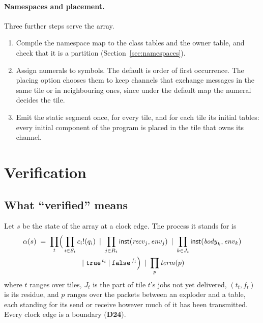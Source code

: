 \documentclass[10.5pt,a4paper]{extarticle}
\newcommand{\kw}[1]{\texttt{#1}}
\newcommand{\tru}{\kw{true}}
\newcommand{\fls}{\kw{false}}
\newcommand{\snd}[2]{#1!(#2)}
\newcommand{\cpar}{\mathbin{|}}
\newcommand{\dec}[1]{\textbf{D#1}}
\theoremstyle{definition}
\theoremstyle{remark}
\begin{document}
\paragraph{Namespaces and placement.} Three further steps serve the array.
\begin{enumerate}
\item Compile the namespace map to the class tables and the owner table, and
check that it is a partition (Section~\ref{sec:namespaces}).
\item Assign numerals to symbols. The default is order of first occurrence.
The placing option chooses them to keep channels that exchange messages in
the same tile or in neighbouring ones, since under the default map the
numeral decides the tile.
\item Emit the static segment once, for every tile, and for each tile its
initial tables: every initial component of the program is placed in the tile
that owns its channel.
\end{enumerate}

\section{Verification}\label{sec:verification}

\subsection{What ``verified'' means}

Let $s$ be the state of the array at a clock edge. The process it stands for
is
\begin{multline*}
\alpha(s) \;=\; \prod_{t}\Bigl(\, \prod_{i \in S_t} \snd{c_i}{q_i} \;\cpar\;
   \prod_{j \in R_t} \mathsf{inst}(\mathit{recv}_j,\mathit{env}_j) \;\cpar\;
   \prod_{k \in J_t} \mathsf{inst}(\mathit{body}_k,\mathit{env}_k)\\
   \;\cpar\; \tru^{\,t_t} \cpar \fls^{\,f_t} \Bigr) \;\cpar\; \prod_{p} \mathit{term}(p)
\end{multline*}
where $t$ ranges over tiles, $J_t$ is the part of tile $t$'s jobs not yet
delivered, $(t_t, f_t)$ is its residue, and $p$ ranges over the packets
between an exploder and a table, each standing for its send or receive
however much of it has been transmitted. Every clock edge is a boundary
(\dec{24}).
\end{document}
